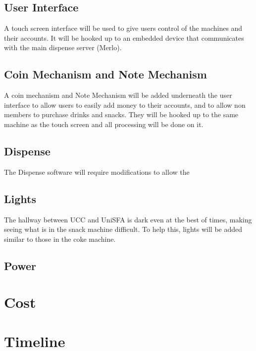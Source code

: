 \documentclass[a4paper,12pt,openany,notitlepage]{report}
\begin{document}
\subsection{User Interface}
A touch screen interface will be used to give users control of the machines and their accounts.
It will be hooked up to an embedded device that communicates with the main dispense server (Merlo).

\subsection{Coin Mechanism and Note Mechanism}
A coin mechanism and Note Mechanism will be added underneath the user interface to allow users to easily add money to their accounts, and to allow non members to purchase drinks and snacks.
They will be hooked up to the same machine as the touch screen and all processing will be done on it.

\subsection{Dispense}
The Dispense software will require modifications to allow the 

\subsection{Lights}
The hallway between UCC and UniSFA is dark even at the best of times, making seeing what is in the snack machine difficult.
To help this, lights will be added similar to those in the coke machine.

\subsection{Power}

\section{Cost}

\section{Timeline}


\end{document}
